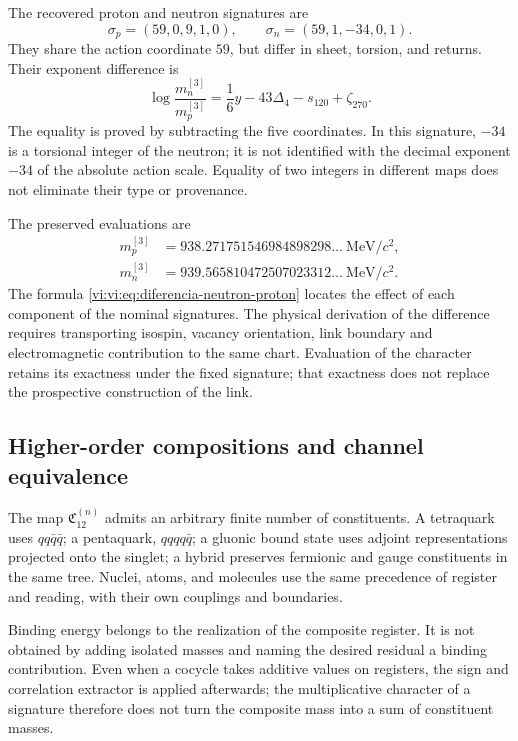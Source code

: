 The recovered proton and neutron signatures are
\[
 \sigma_p=(59,0,9,1,0),\qquad
 \sigma_n=(59,1,-34,0,1).
\]
They share the action coordinate \(59\), but differ in sheet,
torsion, and returns. Their exponent difference is
\begin{equation}
 \log\frac{m_n^{[3]}}{m_p^{[3]}}
 =\frac16y-43\Delta_4-s_{120}+\zeta_{270}.
 \label{vi:vi:eq:diferencia-neutron-proton}
\end{equation}
The equality is proved by subtracting the five coordinates. In this signature,
\(-34\) is a torsional integer of the neutron; it is not identified with the
decimal exponent \(-34\) of the absolute action scale. Equality
of two integers in different maps does not eliminate their type or provenance.

The preserved evaluations are
\begin{align*}
 m_p^{[3]}&=938.271751546984898298\ldots\ \mathrm{MeV}/c^2,\\
 m_n^{[3]}&=939.565810472507023312\ldots\ \mathrm{MeV}/c^2.
\end{align*}
The formula \eqref{vi:vi:eq:diferencia-neutron-proton} locates the effect of
each component of the nominal signatures. The physical derivation of the
difference requires transporting isospin, vacancy orientation,
link boundary and electromagnetic contribution to the same chart.
Evaluation of the character retains its exactness under the fixed signature;
that exactness does not replace the prospective construction of the link.

\subsection{Higher-order compositions and channel equivalence}
\label{vi:vi:subsec:compuestos-superiores}

The map \(\mathfrak C_{12}^{(n)}\) admits an arbitrary finite
number of constituents. A tetraquark uses \(qq\bar q\bar q\);
a pentaquark, \(qqqq\bar q\); a gluonic bound state uses
adjoint representations projected onto the singlet; a hybrid preserves
fermionic and gauge constituents in the same tree. Nuclei,
atoms, and molecules use the same precedence of register and reading,
with their own couplings and boundaries.

Binding energy belongs to the realization of the composite register.
It is not obtained by adding isolated masses and naming the desired
residual a binding contribution. Even when a cocycle takes additive values on
registers, the sign and correlation extractor is applied afterwards;
the multiplicative character of a signature therefore does not turn the composite
mass into a sum of constituent masses.

